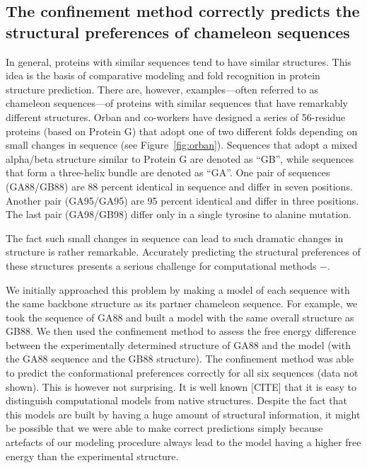 \documentclass[12pt]{article}
\begin{document}
\subsection{The confinement method correctly predicts the structural preferences of chameleon
sequences}

In general, proteins with similar sequences tend to have similar structures. This idea is the basis
of comparative modeling and fold recognition in protein structure prediction. There are, however,
examples---often referred to as chameleon sequences---of proteins with similar sequences that have
remarkably different structures. Orban and co-workers have designed a series of 56-residue proteins
(based on Protein G) that adopt one of two different folds depending on small changes in sequence
(see Figure~\ref{fig:orban}). Sequences that adopt a mixed alpha/beta structure similar to Protein G
are denoted as ``GB'', while sequences that form a three-helix bundle are denoted as ``GA''. One
pair of sequences (GA88/GB88) are 88 percent identical in sequence and differ in seven positions. Another pair
(GA95/GA95) are 95 percent identical and differ in three positions. The last pair (GA98/GB98) differ
only in a single tyrosine to alanine mutation.

The fact such small changes in sequence can lead to such dramatic changes in structure is rather
remarkable. Accurately predicting the structural preferences of these structures presents a serious
challenge for computational methods \cite{Alexander2007}$-$\cite{Shortle20009}.

We initially approached this problem by making a model of each sequence with the same backbone
structure as its partner chameleon sequence. For example, we took the sequence of GA88 and built a
model with the same overall structure as GB88. We then used the confinement method to assess the
free energy difference between the experimentally determined structure of GA88 and the model (with
the GA88 sequence and the GB88 structure). The confinement method was able to predict the
conformational preferences correctly for all six sequences (data not shown). This is however not
surprising. It is well known [CITE] that it is easy to distinguish computational models from native
structures. Despite the fact that this models are built by having a huge amount of structural
information, it might be possible that we were able to make correct predictions simply
because artefacts of our modeling procedure always lead to the model having a higher free energy
than the experimental structure. 
\end{document}
